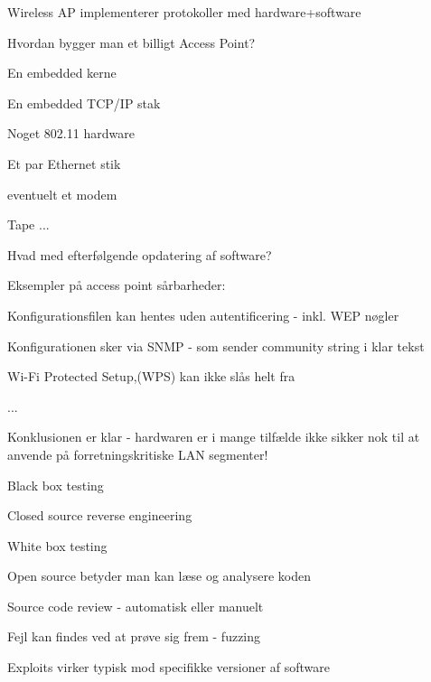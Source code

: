 \documentclass[20pt,landscape,a4paper,footrule]{foils}
\begin{document}


\centerline{Wireless AP implementerer protokoller med hardware+software}

\begin{list1}
\item Hvordan bygger man et billigt Access Point?
\begin{list2}
\item En embedded kerne
\item En embedded TCP/IP stak
\item Noget 802.11 hardware
\item Et par Ethernet stik
\item eventuelt et modem
\item Tape ...
\end{list2}
\item Hvad med efterfølgende opdatering af software?
\end{list1}

\begin{list1}
\item Eksempler på access point sårbarheder:
\item Konfigurationsfilen kan hentes uden autentificering - inkl. WEP
  nøgler
\item Konfigurationen sker via SNMP - som sender community string i
  klar tekst
\item  Wi-Fi Protected Setup,(WPS) kan ikke slås helt fra
\item ...
\item Konklusionen er klar - hardwaren er i mange tilfælde ikke sikker
  nok til at anvende på forretningskritiske LAN segmenter!
\end{list1}



\begin{list1}
\item Black box testing
\item Closed source reverse engineering
\item White box testing
\item Open source betyder man kan læse og analysere koden
\item Source code review - automatisk eller manuelt
\item Fejl kan findes ved at prøve sig frem - fuzzing
\item Exploits virker typisk mod specifikke versioner af software
\end{list1}
\end{document}
